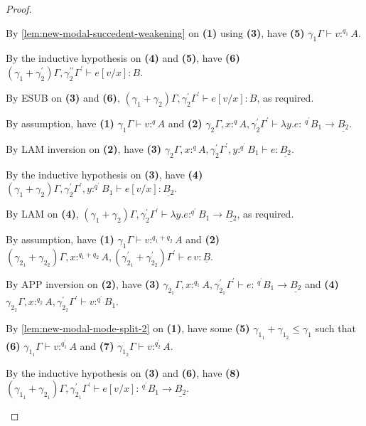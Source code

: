 \documentclass[acmsmall,screen,nonacm]{acmart}
\newcommand{\tee}{\vdash}
\begin{document}
\begin{proof}
\begin{description}
    By \ref{lem:new-modal-succedent-weakening} on \textbf{(1)} using \textbf{(3)}, have \textbf{(5)} $\gamma_1\Gamma \tee v :^{q_1} A$.

    By the inductive hypothesis on \textbf{(4)} and \textbf{(5)}, have \textbf{(6)} $(\gamma_1 + \gamma_2^\prime)\Gamma, \gamma_2^{\prime\prime}\Gamma^\prime \tee e[v/x] : B$.

    By ESUB on \textbf{(3)} and \textbf{(6)}, $(\gamma_1 + \gamma_2)\Gamma, \gamma_2^\prime\Gamma^\prime \tee e[v/x] : B$, as required.
    \\
    \item[Case LAM.]
    By assumption, have \textbf{(1)} $\gamma_1\Gamma \tee v :^q A$ and \textbf{(2)} $\gamma_2\Gamma, x :^q A, \gamma_2^\prime\Gamma^\prime \tee \lambda y.e : \,^{q^\prime} B_1 \rightarrow \underline{B_2}$.

    By LAM inversion on \textbf{(2)}, have \textbf{(3)} $\gamma_2\Gamma, x :^q A, \gamma_2^\prime\Gamma^\prime, y :^{q^\prime} B_1 \tee e : \underline{B_2}$.

    By the inductive hypothesis on \textbf{(3)}, have \textbf{(4)} $(\gamma_1 + \gamma_2)\Gamma, \gamma_2^\prime\Gamma^\prime, y :^{q^\prime} B_1 \tee e[v/x] : \underline{B_2}$.

    By LAM on \textbf{(4)}, $(\gamma_1 + \gamma_2)\Gamma, \gamma_2^\prime\Gamma^\prime \tee \lambda y.e :^{q^\prime} B_1 \rightarrow \underline{B_2}$, as required.
    \\
    \item[Case APP.]
    By assumption, have \textbf{(1)} $\gamma_1\Gamma \tee v :^{q_1 + q_2} A$ and \textbf{(2)} $(\gamma_{2_1} + \gamma_{2_2})\Gamma, x :^{q_1 + q_2} A, (\gamma_{2_1}^\prime + \gamma_{2_2}^\prime)\Gamma^\prime \tee e \, v : \underline{B}$.

    By APP inversion on \textbf{(2)}, have \textbf{(3)} $\gamma_{2_1}\Gamma, x :^{q_1} A, \gamma_{2_1}^\prime\Gamma^\prime \tee e : \,^{q^\prime} B_1 \rightarrow \underline{B_2}$ and \textbf{(4)} $\gamma_{2_2}\Gamma, x :^{q_2} A, \gamma_{2_2}^\prime\Gamma^\prime \tee v :^{q^\prime} B_1$.

    By \ref{lem:new-modal-mode-split-2} on \textbf{(1)}, have some \textbf{(5)} $\gamma_{1_1} + \gamma_{1_2} \le \gamma_1$ such that \textbf{(6)} $\gamma_{1_1}\Gamma \tee v :^{q_1^\prime} A$ and \textbf{(7)} $\gamma_{1_2}\Gamma \tee v :^{q_2^\prime} A$.
    
    By the inductive hypothesis on \textbf{(3)} and \textbf{(6)}, have \textbf{(8)} $(\gamma_{1_1} + \gamma_{2_1})\Gamma, \gamma_{2_1}^\prime\Gamma^\prime \tee e[v/x] : \,^{q^\prime} B_1 \rightarrow \underline{B_2}$. 


\end{description}
\end{proof}
\end{document}
